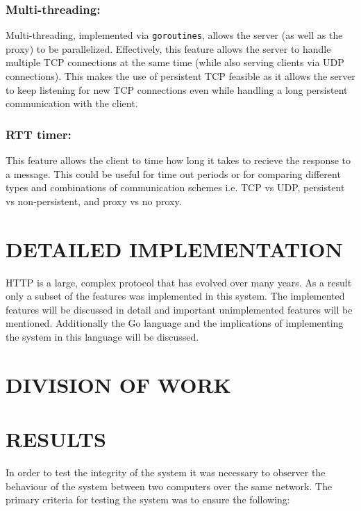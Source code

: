 \documentclass[10pt,twocolumn]{witseiepaper}
\begin{document}
	\subsubsection{Multi-threading:} \label{thread}

	Multi-threading, implemented via \verb|goroutines|, allows the server (as well as the proxy) to be parallelized. Effectively, this feature allows the server to handle multiple TCP connections at the same time (while also serving clients via UDP connections). This makes the use of persistent TCP feasible as it allows the server to keep listening for new TCP connections even while handling a long persistent communication with the client.

	\subsubsection{RTT timer:}

	This feature allows the client to time how long it takes to recieve the response to a message. This could be useful for time out periods or for comparing different types and combinations of communication schemes i.e. TCP vs UDP, persistent vs non-persistent, and proxy vs no proxy.

\section{DETAILED IMPLEMENTATION}

HTTP is a large, complex protocol that has evolved over many years. As a result only a subset of the features was implemented in this system. The implemented features will be discussed in detail and important unimplemented features will be mentioned. Additionally the Go language and the implications of implementing the system in this language will be discussed.

\section{DIVISION OF WORK}

\section{RESULTS}

	In order to test the integrity of the system it was necessary to observer the behaviour of the system between two computers over the same network. The primary criteria for testing the system was to ensure the following:
\end{document}
